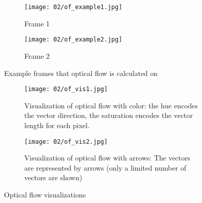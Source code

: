 \begin{figure}
\centering
    \hfill
    \begin{subfigure}[b]{0.45\textwidth}            
            \centering
            \texttt{[image: 02/of\_example1.jpg]}
            \caption{Frame 1}
    \end{subfigure}%
    \hfill
    \begin{subfigure}[b]{0.45\textwidth}
            \centering
            \texttt{[image: 02/of\_example2.jpg]}
            \caption{Frame 2}
    \end{subfigure}
    \hfill
    \caption[Optical flow example]{Example frames that optical flow is calculated on}\label{fig:of_example_bike}
    \par\bigskip

    \hfill
    \begin{subfigure}[b]{0.45\textwidth}            
            \centering
            \texttt{[image: 02/of\_vis1.jpg]}
            \caption{Visualization of optical flow with color: the hue encodes the vector direction, the saturation encodes the vector length for each pixel.}
    \end{subfigure}%
    \hfill
    \begin{subfigure}[b]{0.45\textwidth}
            \centering
            \texttt{[image: 02/of\_vis2.jpg]}
            \caption{Visualization of optical flow with arrows: The vectors are represented by arrows (only a limited number of vectors are shown)}
    \end{subfigure}
    \hfill
    \caption[Optical flow visualizations]{Optical flow visualizations}\label{fig:of_vis}
\end{figure}

